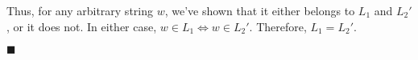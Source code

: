 \documentclass[a4paper]{exam}
\begin{document}
\begin{questions}
\begin{solution}
Thus, for any arbitrary string $w$, we've shown that it either belongs to $L_1$ and $L_2'$, or it does not. In either case, $ w \in L_1 \iff w \in L_2'$. Therefore, $L_1 = L_2'$.
\begin{flushright}
  $\blacksquare$
\end{flushright}


\end{solution}
\end{questions}
\end{document}
